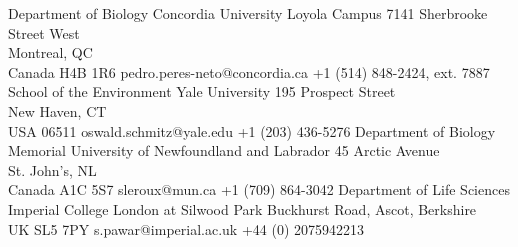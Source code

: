 
\cvdoublecolumn
{
  {Department of Biology}
  {Concordia University Loyola Campus}
  {7141 Sherbrooke Street West\\
  Montreal, QC\\
  Canada H4B 1R6}
  {pedro.peres-neto@concordia.ca}
  {+1 (514) 848-2424, ext. 7887}
}
{
  {School of the Environment}
  {Yale University}
  {195 Prospect Street\\
  New Haven, CT\\
  USA 06511}
  {oswald.schmitz@yale.edu}
  {+1 (203) 436-5276}
}
{
  {Department of Biology}
  {Memorial University of Newfoundland and Labrador}
  {45 Arctic Avenue\\
  St. John's, NL\\
  Canada A1C 5S7}
  {sleroux@mun.ca}
  {+1 (709) 864-3042}
}
{
  {Department of Life Sciences}
  {Imperial College London at Silwood Park}
  {Buckhurst Road, Ascot, Berkshire\\
  UK SL5 7PY}
  {s.pawar@imperial.ac.uk}
  {+44 (0) 2075942213}
}



